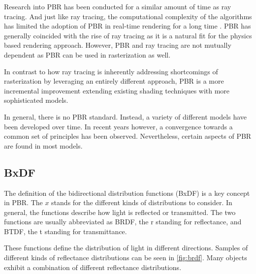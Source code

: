 Research into PBR has been conducted for a similar amount of time as ray tracing. And just like ray tracing, the computational complexity of the algorithms has limited the adoption of PBR in real-time rendering for a long time . PBR has generally coincided with the rise of ray tracing as it is a natural fit for the physics based rendering approach. However, PBR and ray tracing are not mutually dependent as PBR can be used in rasterization as well.

In contrast to how ray tracing is inherently addressing shortcomings of rasterization by leveraging an entirely different approach, PBR is a more incremental improvement extending existing shading techniques with more sophisticated models.

In general, there is no PBR standard. Instead, a variety of different models have been developed over time. In recent years however, a convergence towards a common set of principles has been observed. Nevertheless, certain aspects of PBR are found in most models.

\subsection{BxDF}

The definition of the bidirectional distribution functions (BxDF) is a key concept in PBR. The $x$ stands for the different kinds of distributions to consider. In general, the functions describe how light is reflected or transmitted. The two functions are usually abbreviated as BRDF, the r standing for reflectance, and BTDF, the t standing for transmittance.

These functions define the distribution of light in different directions. Samples of different kinds of reflectance distributions can be seen in \autoref{fig:brdf}. Many objects exhibit a combination of different reflectance distributions.

